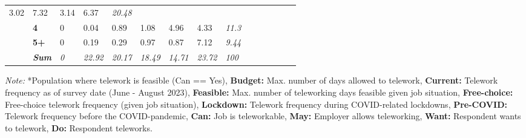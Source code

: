 \begin{table}
{\begin{threeparttable}
\begin{tabular}{lllllllllllllll}
  \cellcolor[HTML]{EBEBEB}3.02 &
  \cellcolor[HTML]{CFCFCF}7.32 &
  \cellcolor[HTML]{EBEBEB}3.14 &
  \cellcolor[HTML]{D5D5D5}6.37 &
  \textit{20.48} &
   &
   &
   &
   &
   &
  \textit{} \\
 &
  \textbf{4} &
  \cellcolor[HTML]{FFFFFF}0 &
  \cellcolor[HTML]{FFFFFF}0.04 &
  \cellcolor[HTML]{FAFAFA}0.89 &
  \cellcolor[HTML]{F8F8F8}1.08 &
  \cellcolor[HTML]{DEDEDE}4.96 &
  \cellcolor[HTML]{E3E3E3}4.33 &
  \textit{11.3} &
   &
   &
   &
   &
   &
  \textit{} \\
 &
  \textbf{5+} &
  \cellcolor[HTML]{FFFFFF}0 &
  \cellcolor[HTML]{FEFEFE}0.19 &
  \cellcolor[HTML]{FEFEFE}0.29 &
  \cellcolor[HTML]{F9F9F9}0.97 &
  \cellcolor[HTML]{FAFAFA}0.87 &
  \cellcolor[HTML]{D0D0D0}7.12 &
  \textit{9.44} &
   &
   &
   &
   &
   &
  \textit{} \\
\textit{} &
  \textit{\textbf{Sum}} &
  \textit{0} &
  \textit{22.92} &
  \textit{20.17} &
  \textit{18.49} &
  \textit{14.71} &
  \textit{23.72} &
  \textit{100} &
  \textit{} &
  \textit{} &
  \textit{} &
  \textit{} &
  \textit{} &
  \textit{} \\
  \bottomrule
\end{tabular}%
\begin{tablenotes}[flushleft]
    \item \textit{Note:} *Population where telework is feasible (Can == Yes), \textbf{Budget:} Max. number of days allowed to telework, \textbf{Current:} Telework frequency as of survey date (June - August 2023), \textbf{Feasible:} Max. number of teleworking days feasible given job situation, \textbf{Free-choice:} Free-choice telework frequency (given job situation), \textbf{Lockdown:} Telework frequency during COVID-related lockdowns, \textbf{Pre-COVID:} Telework frequency before the COVID-pandemic, \textbf{Can:} Job is teleworkable, \textbf{May:} Employer allows teleworking, \textbf{Want:} Respondent wants to telework, \textbf{Do:} Respondent teleworks.
\end{tablenotes}
\end{threeparttable}%
}
\end{table}
